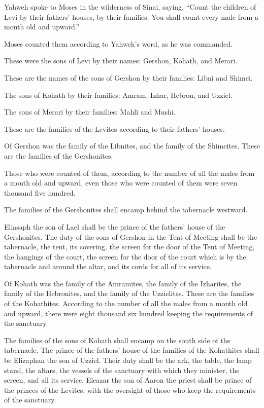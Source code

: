  Yahweh spoke to Moses in the wilderness of Sinai, saying,
 ``Count the children of Levi by their fathers' houses, by
their families. You shall count every male from a month old and
upward.''

 Moses counted them according to Yahweh's word, as he was
commanded.

 These were the sons of Levi by their names: Gershon,
Kohath, and Merari.

 These are the names of the sons of Gershon by their
families: Libni and Shimei.

 The sons of Kohath by their families: Amram, Izhar,
Hebron, and Uzziel.

 The sons of Merari by their families: Mahli and Mushi.

These are the families of the Levites according to their fathers'
houses.

 Of Gershon was the family of the Libnites, and the family
of the Shimeites. These are the families of the Gershonites.

 Those who were counted of them, according to the number of
all the males from a month old and upward, even those who were counted
of them were seven thousand five hundred.

 The families of the Gershonites shall encamp behind the
tabernacle westward.

 Eliasaph the son of Lael shall be the prince of the
fathers' house of the Gershonites.  The duty of the sons of
Gershon in the Tent of Meeting shall be the tabernacle, the tent, its
covering, the screen for the door of the Tent of Meeting, 
the hangings of the court, the screen for the door of the court which is
by the tabernacle and around the altar, and its cords for all of its
service.

 Of Kohath was the family of the Amramites, the family of
the Izharites, the family of the Hebronites, and the family of the
Uzzielites. These are the families of the Kohathites. 
According to the number of all the males from a month old and upward,
there were eight thousand six hundred keeping the requirements of the
sanctuary.

 The families of the sons of Kohath shall encamp on the
south side of the tabernacle.  The prince of the fathers'
house of the families of the Kohathites shall be Elizaphan the son of
Uzziel.  Their duty shall be the ark, the table, the lamp
stand, the altars, the vessels of the sanctuary with which they
minister, the screen, and all its service.  Eleazar the son
of Aaron the priest shall be prince of the princes of the Levites, with
the oversight of those who keep the requirements of the sanctuary.


